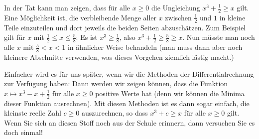 \documentclass{ximera}
\begin{document}
In der Tat kann man zeigen, dass für alle $x\ge 0$ die Ungleichung $x^3 + \frac 12 \ge x$ gilt. Eine Möglichkeit ist, die verbleibende Menge aller $x$ zwischen $\frac 12$ und $1$ in kleine Teile einzuteilen und dort jeweils die beiden Seiten abzuschätzen. Zum Beispiel gilt für $x$ mit $\frac 12 \le x \le \frac 58$: Es ist $x^3 \ge \frac 18$, also $x^3 + \frac 12 \ge \frac 58 \ge x$. Nun müsste man noch alle $x$ mit $\frac 58 < x < 1$ in ähnlicher Weise behandeln (man muss dann aber noch kleinere Abschnitte verwenden, was dieses Vorgehen ziemlich lästig macht.)

Einfacher wird es für uns später, wenn wir die Methoden der Differentialrechnung zur Verfügung haben: Dann werden wir zeigen können, dass die Funktion $x\mapsto x^3 - x + \frac 12$ für alle $x\ge 0$ positive Werte hat (denn wir können die Minima dieser Funktion ausrechnen). Mit diesen Methoden ist es dann sogar einfach, die kleinste reelle Zahl $c\ge 0$ auszurechnen, so dass $x^3+c \ge x$ für alle $x\ge 0$ gilt. Wenn Sie sich an diesen Stoff noch aus der Schule erinnern, dann versuchen Sie es doch einmal!
\end{document}
